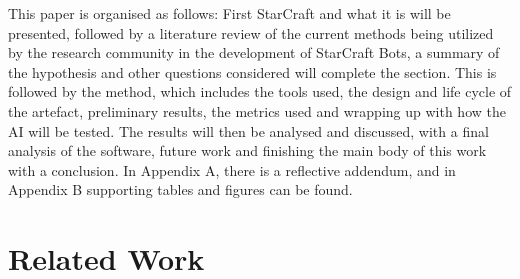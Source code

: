 \documentclass[journal]{IEEEtran}
\begin{document}
	This paper is organised as follows:
	First StarCraft and what it is will be presented, followed by a literature review of the current methods being utilized by the research community in the development of StarCraft Bots, a summary of the hypothesis and other questions considered will complete the section. This is followed by the method, which includes the tools used, the design and life cycle of the artefact, preliminary results, the metrics used and wrapping up with how the AI will be tested. The results will then be analysed and discussed, with a final analysis of the software, future work and finishing the main body of this work with a conclusion. In Appendix A, there is a reflective addendum, and in Appendix B supporting tables and figures can be found.
	
	\section{Related Work}
\end{document}
